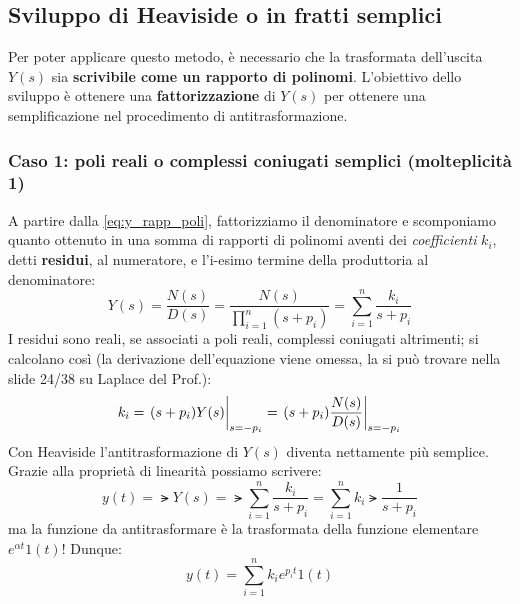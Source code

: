 \subsection{Sviluppo di Heaviside o in fratti semplici}
\begin{defin}{}{}
Per poter applicare questo metodo, è necessario che la trasformata dell'uscita $Y(s)$ sia \textbf{scrivibile come un rapporto di polinomi}. L'obiettivo dello sviluppo è ottenere una \textbf{fattorizzazione} di $Y(s)$ per ottenere una semplificazione  nel procedimento di antitrasformazione. 

\subsubsection{Caso 1: poli reali o complessi coniugati semplici (molteplicità 1)}
A partire dalla \eqref{eq:y_rapp_poli}, fattorizziamo il denominatore e scomponiamo quanto ottenuto in una somma di rapporti di polinomi aventi dei \textit{coefficienti} $k_i$, detti \textbf{residui}, al numeratore, e l'i-esimo termine della produttoria al denominatore:
\begin{equation}
Y(s) = \frac{N(s)}{D(s)} = \frac{N(s)}{\prod_{i=1}^n (s+p_i)} = \sum_{i=1}^n \frac{k_i}{s+p_i}
\end{equation}
I residui sono reali, se associati a poli reali, complessi coniugati altrimenti; si calcolano così (la derivazione dell'equazione viene omessa, la si può trovare nella slide 24/38 su Laplace del Prof.):
\begin{equation}
k_i = \eval{(s+p_i)Y(s)}_{s=-p_i} = \eval{(s+p_i)\frac{N(s)}{D(s)}}_{s=-p_i}
\end{equation}
\begin{equation*}
\end{equation*} 
Con Heaviside l'antitrasformazione di $Y(s)$ diventa nettamente più semplice. Grazie alla proprietà di linearità possiamo scrivere:
\begin{equation*}
y(t) = \lat{Y(s)} = \lat{\sum_{i=1}^n \frac{k_i}{s+p_i}} = \sum_{i=1}^n k_i \lat{\frac{1}{s+p_i}}
\end{equation*} 
ma la funzione da antitrasformare è la trasformata della funzione elementare $e^{\alpha t}1(t)$! Dunque:
\begin{equation}
y(t) = \sum_{i=1}^n k_i e^{p_i t}1(t)
\end{equation}
\end{defin}
